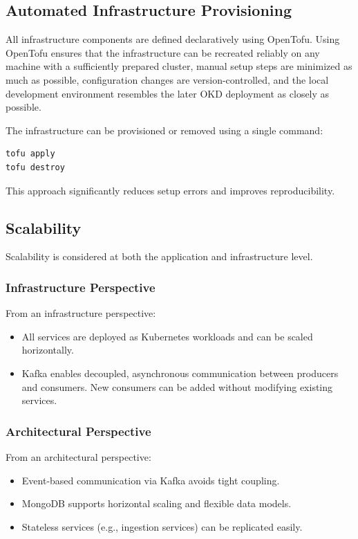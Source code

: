 \documentclass[12pt,a4paper,onecolumn,twoside]{tau-class/tau}
\begin{document}
\subsection{Automated Infrastructure Provisioning}

All infrastructure components are defined declaratively using OpenTofu. Using OpenTofu ensures that the infrastructure can be recreated reliably on any machine with a sufficiently prepared cluster, manual setup steps are minimized as much as possible, configuration changes are version-controlled, and the local development environment resembles the later OKD deployment as closely as possible.

The infrastructure can be provisioned or removed using a single command:

\begin{verbatim}
tofu apply
tofu destroy
\end{verbatim}

This approach significantly reduces setup errors and improves reproducibility.

\subsection{Scalability}

Scalability is considered at both the application and infrastructure level.

\subsubsection*{Infrastructure Perspective}

From an infrastructure perspective:

\begin{itemize}
    \item All services are deployed as Kubernetes workloads and can be scaled horizontally.
    \item Kafka enables decoupled, asynchronous communication between producers and consumers. New consumers can be added without modifying existing services.
\end{itemize}

\subsubsection*{Architectural Perspective}

From an architectural perspective:

\begin{itemize}
    \item Event-based communication via Kafka avoids tight coupling.
    \item MongoDB supports horizontal scaling and flexible data models.
    \item Stateless services (e.g., ingestion services) can be replicated easily.
\end{itemize}
\end{document}
